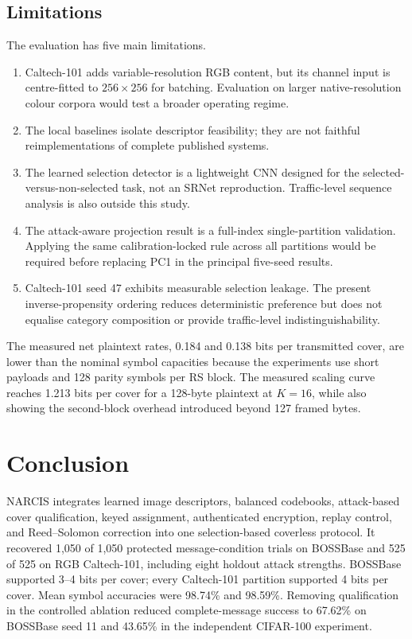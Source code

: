 ﻿\documentclass[a4paper,fleqn]{cas-dc}
\begin{document}
\subsection{Limitations}

The evaluation has five main limitations.

\begin{enumerate}
\item Caltech-101 adds variable-resolution RGB content, but its channel input
is centre-fitted to $256\times256$ for batching. Evaluation on larger
native-resolution colour corpora would test a broader operating regime.
\item The local baselines isolate descriptor feasibility; they are not faithful
reimplementations of complete published systems.
\item The learned selection detector is a lightweight CNN designed for the
selected-versus-non-selected task, not an SRNet reproduction. Traffic-level
sequence analysis is also outside this study.
\item The attack-aware projection result is a full-index single-partition
validation. Applying the same calibration-locked rule across all partitions
would be required before replacing PC1 in the principal five-seed results.
\item Caltech-101 seed 47 exhibits measurable selection leakage. The present
inverse-propensity ordering reduces deterministic preference but does not
equalise category composition or provide traffic-level indistinguishability.
\end{enumerate}

The measured net plaintext rates, 0.184 and 0.138 bits per transmitted cover,
are lower than the nominal symbol capacities because the experiments use
short payloads and 128 parity symbols per RS block. The measured scaling curve
reaches 1.213 bits per cover for a 128-byte plaintext at $K=16$, while also
showing the second-block overhead introduced beyond 127 framed bytes.

\section{Conclusion}
\label{sec:conclusion}

NARCIS integrates learned image descriptors, balanced codebooks, attack-based
cover qualification, keyed assignment, authenticated encryption, replay
control, and Reed--Solomon correction into one selection-based coverless
protocol. It recovered 1,050 of 1,050 protected message-condition trials on
BOSSBase and 525 of 525 on RGB Caltech-101, including eight holdout attack
strengths. BOSSBase supported 3--4 bits per cover; every Caltech-101 partition
supported 4 bits per cover. Mean symbol accuracies were 98.74\% and 98.59\%.
Removing qualification in the controlled ablation reduced complete-message
success to 67.62\% on BOSSBase seed 11 and 43.65\% in the independent
CIFAR-100 experiment.
\end{document}
